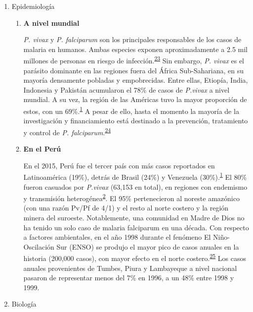 \documentclass[]{article}
\begin{document}
\begin{enumerate}
\def\labelenumi{\alph{enumi}.}
\item
  Epidemiología

  \begin{enumerate}
  \def\labelenumii{\roman{enumii}.}
  \item
    \textbf{A nivel mundial}

    \emph{P. vivax} y \emph{P. falciparum} son los principales
    responsables de los casos de malaria en humanos. Ambas especies
    exponen aproximadamente a 2.5 mil millones de personas en riesgo de
    infección.\textsuperscript{\protect\hyperlink{ref-howes2016global}{23}}
    Sin embargo, \emph{P. vivax} es el parásito dominante en las
    regiones fuera del África Sub-Sahariana, en su mayoría densamente
    pobladas y empobrecidas. Entre ellas, Etiopía, India, Indonesia y
    Pakistán acumularon el 78\% de casos de \emph{P.vivax} a nivel
    mundial. A su vez, la región de las Américas tuvo la mayor
    proporción de estos, con un
    69\%.\textsuperscript{\protect\hyperlink{ref-WHO2016world}{1}} A
    pesar de ello, hasta el momento la mayoría de la investigación y
    financiamiento está destinado a la prevención, tratamiento y control
    de \emph{P.
    falciparum}.\textsuperscript{\protect\hyperlink{ref-path2011}{24}}
  \item
    \textbf{En el Perú}

    En el 2015, Perú fue el tercer país con más casos reportados en
    Latinoamérica (19\%), detrás de Brasil (24\%) y Venezuela
    (30\%).\textsuperscript{\protect\hyperlink{ref-WHO2016world}{1}} El
    80\% fueron casuados por \emph{P.vivax} (63,153 en total), en
    regiones con endemismo y transmisión
    heterogénea\textsuperscript{\protect\hyperlink{ref-rosas2016peru}{2}}.
    El 95\% pertenecieron al noreste amazónico (con una razón Pv/Pf de
    4/1) y el resto al norte costero y la región minera del suroeste.
    Notablemente, una comunidad en Madre de Dios no ha tenido un solo
    caso de malaria falciparum en una década. Con respecto a factores
    ambientales, en el año 1998 durante el fenómeno El Niño-Oscilación
    Sur (ENSO) se produjo el mayor pico de casos anuales en la historia
    (200,000 casos), con mayor efecto en el norte
    costero.\textsuperscript{\protect\hyperlink{ref-gagnon2002enso}{25}}
    Los casos anuales provenientes de Tumbes, Piura y Lambayeque a nivel
    nacional pasaron de representar menos del 7\% en 1996, a un 48\%
    entre 1998 y 1999.
  \end{enumerate}
\item
  Biología


\end{enumerate}
\end{document}
